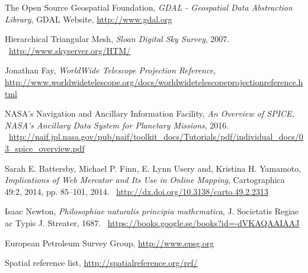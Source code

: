 \begin{thebibliography}{99}
  The Open Source Geospatial Foundation,
  \emph{GDAL - Geospatial Data Abstraction Library},
  GDAL Website,
  \url{http://www.gdal.org}

  Hierarchical Triangular Mesh,
  \emph{Sloan Digital Sky Survey},
  2007. \
  \url{http://www.skyserver.org/HTM/}
  
  Jonathan Fay,
  \emph{WorldWide Telescope Projection Reference},
  \url{http://www.worldwidetelescope.org/docs/worldwidetelescopeprojectionreference.html}

  NASA's Navigation and Ancillary Information Facility,
  \emph{An Overview of SPICE, NASA’s Ancillary Data System for Planetary Missions},
  2016. \
  \url{http://naif.jpl.nasa.gov/pub/naif/toolkit_docs/Tutorials/pdf/individual_docs/03_spice_overview.pdf}

\bibitem{battersby14}
  Sarah E. Battersby, Michael P. Finn, E. Lynn Usery and, Kristina H. Yamamoto,
  \emph{Implications of Web Mercator and Its Use in Online Mapping},
  Cartographica 49:2, 2014, pp. 85–101,
  2014. \
  \url{http://dx.doi.org/10.3138/carto.49.2.2313}

  Isaac Newton,
  \emph{Philosophiae naturalis principia mathematica},
  J. Societatis Regiae ac Typis J. Streater,
  1687. \
  \url{https://books.google.se/books?id=-dVKAQAAIAAJ}
  
\bibitem{epsg}
  European Petroleum Survey Group,
  \url{http://www.epsg.org}
  
  Spatial reference list,
  \url{http://spatialreference.org/ref/}

\end{thebibliography}
